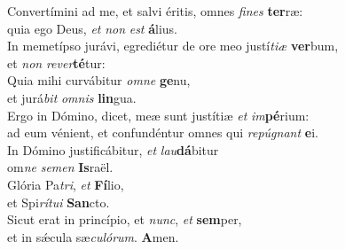 \evenverse Convertímini ad me, et salvi éritis, omnes \textit{fi}\textit{nes} \textbf{ter}ræ:~\*\\
\evenverse quia ego Deus, \textit{et} \textit{non} \textit{est} \textbf{á}lius.\\
\oddverse In memetípso jurávi, egrediétur de ore meo justí\textit{ti}\textit{æ} \textbf{ver}bum,~\*\\
\oddverse et \textit{non} \textit{re}\textit{ver}\textbf{té}tur:\\
\evenverse Quia mihi curvábitur \textit{om}\textit{ne} \textbf{ge}nu,~\*\\
\evenverse et jurá\textit{bit} \textit{om}\textit{nis} \textbf{lin}gua.\\
\oddverse Ergo in Dómino, dicet, meæ sunt justítiæ \textit{et} \textit{im}\textbf{pé}rium:~\*\\
\oddverse ad eum vénient, et confundéntur omnes qui \textit{re}\textit{pú}\textit{gnant} \textbf{e}i.\\
\evenverse In Dómino justificábitur, \textit{et} \textit{lau}\textbf{dá}bitur~\*\\
\evenverse om\textit{ne} \textit{se}\textit{men} \textbf{Is}raël.\\
\oddverse Glória Pa\textit{tri}, \textit{et} \textbf{Fí}lio,~\*\\
\oddverse et Spi\textit{rí}\textit{tu}\textit{i} \textbf{San}cto.\\
\evenverse Sicut erat in princípio, et \textit{nunc}, \textit{et} \textbf{sem}per,~\*\\
\evenverse et in sǽcula sæ\textit{cu}\textit{ló}\textit{rum}. \textbf{A}men.\\
